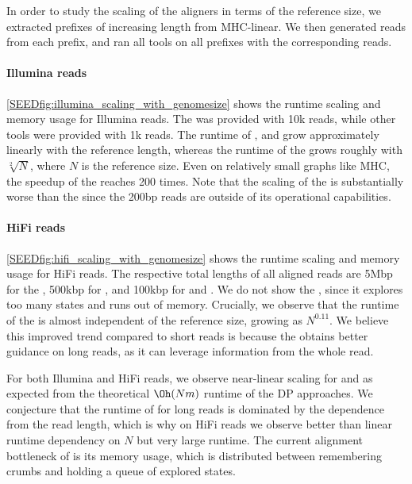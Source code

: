 In order to study the scaling of the aligners in terms of the reference size, we
extracted prefixes of increasing length from MHC-linear. We then generated reads
from each prefix, and ran all tools on all prefixes with the corresponding
reads.

\paragraph{Illumina reads}
\cref{SEEDfig:illumina_scaling_with_genomesize} shows the runtime scaling and memory
usage for Illumina reads. The \seedh was provided with 10k reads, while other
tools were provided with 1k reads.
%
The runtime of \graphaligner, \pasgal and \vargas grow approximately linearly
with the reference length, whereas the runtime of the \seedh grows roughly with
$\sqrt[2]{N}$, where $N$ is the reference size. Even on relatively small graphs
like MHC, the speedup of the \seedh reaches 200 times. Note that the scaling of
the \prefixh is substantially worse than the \seedh since the 200bp reads are
outside of its operational capabilities.

\paragraph{HiFi reads}
\cref{SEEDfig:hifi_scaling_with_genomesize} shows the runtime scaling and memory
usage for HiFi reads. The respective total lengths of all aligned reads are 5Mbp
for the \seedh, 500kbp for \graphaligner, and 100kbp for \vargas and \pasgal. We
do not show the \prefixh, since it explores too many states and runs out of
memory.
%
Crucially, we observe that the runtime of the \seedh is almost independent of
the reference size, growing as $N^{0.11}$. We believe this improved trend
compared to short reads is because the \seedh obtains better guidance on long
reads, as it can leverage information from the whole read.

For both Illumina and HiFi reads, we observe near-linear scaling for \pasgal and
\graphaligner as expected from the theoretical $\Oh(Nm)$ runtime of the DP
approaches. We conjecture that the runtime of \vargas for long reads is
dominated by the dependence from the read length, which is why on HiFi reads we
observe better than linear runtime dependency on $N$ but very large runtime. The
current alignment bottleneck of \astarixseeds is its memory usage, which is
distributed between remembering crumbs and holding a queue of explored states.